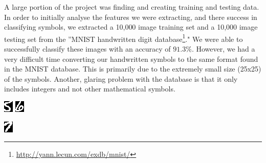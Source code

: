 A large portion of the project was finding and creating training and testing data. In order to initially analyse the features we were extracting, and there success in classifying symbols, we extracted a 10,000 image training set and a 10,000 image testing set from the  ''MNIST handwritten digit database\footnote{\url{http://yann.lecun.com/exdb/mnist/}}." We were able to successfully classify these images with an accuracy of $91.3\%$. However, we had a very difficult time converting our handwritten symbols to the same format found in the MNIST database. This is primarily due to the extremely small size (25x25) of the symbols. Another, glaring problem with the database is that it only includes integers and not other mathematical symbols.


\begin{center}
\begin{minipage}[h!]{.9\linewidth}%
\begin{minipage}[h!]{.9\linewidth}%
\begin{center}
\includegraphics[width=.3\textwidth]{images/mnist1.png}
\includegraphics[width=.3\linewidth]{images/mnist2.png}
\end{center}
\end{minipage}
\vfill
\vspace{1 mm}
\begin{minipage}[h!]{0.9\textwidth}%
\begin{center}
\includegraphics[width=.3\textwidth]{images/mnist3.png}

\end{center}
\end{minipage}
\end{minipage}
\end{center}
